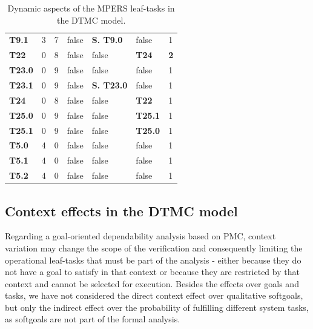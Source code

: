 \begin{table}
{\begin{tabularx}{\textwidth}{@{}lllllll@{}}
\textbf{T9.1}  & 3                  & 7                  & false             & \textbf{S. T9.0}     & false                 & 1           \\
\textbf{T22}   & 0                  & 8                  & false             & false                & \textbf{T24}                  & \textbf{2}  \\
\textbf{T23.0} & 0                  & 9                  & false             & false                & false                  & 1           \\
\textbf{T23.1} & 0                  & 9                  & false             & \textbf{S. T23.0}   & false                  & 1           \\
\textbf{T24}   & 0                  & 8                  & false             & false                & \textbf{T22}                  & 1           \\
\textbf{T25.0} & 0                  & 9                  & false             & false                & \textbf{T25.1                 } & 1           \\
\textbf{T25.1} & 0                  & 9                  & false             & false                & \textbf{T25.0}                  & 1           \\
\textbf{T5.0} & 4                   & 0                  & false             & false                & false                & 1           \\
\textbf{T5.1} & 4                   & 0                  & false             & false                & false                & 1           \\
\textbf{T5.2} & 4                   & 0                  & false             & false                & false                & 1           \\ \bottomrule
\end{tabularx}
\caption{Dynamic aspects of the MPERS leaf-tasks in the DTMC model.}
\label{tab:MPERS_DTMC_SLOTS}
}
\end{table}

\subsection{Context effects in the DTMC model}\label{ssec:ctx_effects_dtmc}

Regarding a goal-oriented dependability analysis based on PMC, context variation may change the scope of the verification and consequently limiting the operational leaf-tasks that must be part of the analysis - either because they do not have a goal to satisfy in that context or because they are restricted by that context and cannot be selected for execution. Besides the effects over goals and tasks, we have not considered the direct context effect over qualitative softgoals, but only the indirect effect over the probability of fulfilling different system tasks, as softgoals are not part of the formal analysis.

